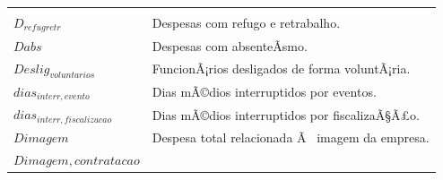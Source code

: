\documentclass[]{article}
\begin{document}
\begin{longtable}[]{@{}ll@{}}
\begin{minipage}[t]{0.87\columnwidth}
\end{minipage}\tabularnewline
\begin{minipage}[t]{0.07\columnwidth}\raggedright\strut
\(D_{refugretr}\)\strut
\end{minipage} & \begin{minipage}[t]{0.87\columnwidth}\raggedright\strut
Despesas com refugo e retrabalho.\strut
\end{minipage}\tabularnewline
\begin{minipage}[t]{0.07\columnwidth}\raggedright\strut
\(Dabs\)\strut
\end{minipage} & \begin{minipage}[t]{0.87\columnwidth}\raggedright\strut
Despesas com absenteÃ­smo.\strut
\end{minipage}\tabularnewline
\begin{minipage}[t]{0.07\columnwidth}\raggedright\strut
\(Deslig_{voluntarios}\)\strut
\end{minipage} & \begin{minipage}[t]{0.87\columnwidth}\raggedright\strut
FuncionÃ¡rios desligados de forma voluntÃ¡ria.\strut
\end{minipage}\tabularnewline
\begin{minipage}[t]{0.07\columnwidth}\raggedright\strut
\(dias_{interr, evento}\)\strut
\end{minipage} & \begin{minipage}[t]{0.87\columnwidth}\raggedright\strut
Dias mÃ©dios interruptidos por eventos.\strut
\end{minipage}\tabularnewline
\begin{minipage}[t]{0.07\columnwidth}\raggedright\strut
\(dias_{interr, fiscalizacao}\)\strut
\end{minipage} & \begin{minipage}[t]{0.87\columnwidth}\raggedright\strut
Dias mÃ©dios interruptidos por fiscalizaÃ§Ã£o.\strut
\end{minipage}\tabularnewline
\begin{minipage}[t]{0.07\columnwidth}\raggedright\strut
\(Dimagem\)\strut
\end{minipage} & \begin{minipage}[t]{0.87\columnwidth}\raggedright\strut
Despesa total relacionada Ã~ imagem da empresa.\strut
\end{minipage}\tabularnewline
\begin{minipage}[t]{0.07\columnwidth}\raggedright\strut
\(Dimagem, contratacao\)\strut
\end{minipage} & \begin{minipage}[t]{0.87\columnwidth}\raggedright\strut

\end{minipage}
\end{longtable}
\end{document}
